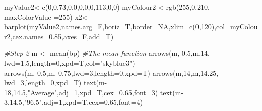 \documentclass[
]{book}
\newenvironment{Shaded}{\begin{snugshade}}{\end{snugshade}}
\newcommand{\AttributeTok}[1]{\textcolor[rgb]{0.77,0.63,0.00}{#1}}
\newcommand{\CommentTok}[1]{\textcolor[rgb]{0.56,0.35,0.01}{\textit{#1}}}
\newcommand{\ConstantTok}[1]{\textcolor[rgb]{0.00,0.00,0.00}{#1}}
\newcommand{\DecValTok}[1]{\textcolor[rgb]{0.00,0.00,0.81}{#1}}
\newcommand{\FloatTok}[1]{\textcolor[rgb]{0.00,0.00,0.81}{#1}}
\newcommand{\FunctionTok}[1]{\textcolor[rgb]{0.00,0.00,0.00}{#1}}
\newcommand{\NormalTok}[1]{#1}
\newcommand{\OtherTok}[1]{\textcolor[rgb]{0.56,0.35,0.01}{#1}}
\newcommand{\SpecialCharTok}[1]{\textcolor[rgb]{0.00,0.00,0.00}{#1}}
\newcommand{\StringTok}[1]{\textcolor[rgb]{0.31,0.60,0.02}{#1}}
\begin{document}
\begin{Shaded}
\begin{Highlighting}[]
\NormalTok{myValue2}\OtherTok{\textless{}{-}}\FunctionTok{c}\NormalTok{(}\DecValTok{0}\NormalTok{,}\DecValTok{0}\NormalTok{,}\DecValTok{73}\NormalTok{,}\DecValTok{0}\NormalTok{,}\DecValTok{0}\NormalTok{,}\DecValTok{0}\NormalTok{,}\DecValTok{0}\NormalTok{,}\DecValTok{0}\NormalTok{,}\DecValTok{113}\NormalTok{,}\DecValTok{0}\NormalTok{,}\DecValTok{0}\NormalTok{)}
\NormalTok{myColour2 }\OtherTok{\textless{}{-}}\FunctionTok{rgb}\NormalTok{(}\DecValTok{255}\NormalTok{,}\DecValTok{0}\NormalTok{,}\DecValTok{210}\NormalTok{, }\AttributeTok{maxColorValue =}\DecValTok{255}\NormalTok{)}
\NormalTok{x2}\OtherTok{\textless{}{-}} \FunctionTok{barplot}\NormalTok{(myValue2,}\AttributeTok{names.arg=}\NormalTok{F,}\AttributeTok{horiz=}\NormalTok{T,}\AttributeTok{border=}\ConstantTok{NA}\NormalTok{,}\AttributeTok{xlim=}\FunctionTok{c}\NormalTok{(}\DecValTok{0}\NormalTok{,}\DecValTok{120}\NormalTok{),}\AttributeTok{col=}\NormalTok{myColour2,}\AttributeTok{cex.names=}\FloatTok{0.85}\NormalTok{,}\AttributeTok{axes=}\NormalTok{F,}\AttributeTok{add=}\NormalTok{T)}

\CommentTok{\#Step 2}
\NormalTok{m }\OtherTok{\textless{}{-}} \FunctionTok{mean}\NormalTok{(bp) }\CommentTok{\#The mean function}
\FunctionTok{arrows}\NormalTok{(m,}\SpecialCharTok{{-}}\FloatTok{0.5}\NormalTok{,m,}\DecValTok{14}\NormalTok{, }\AttributeTok{lwd=}\FloatTok{1.5}\NormalTok{,}\AttributeTok{length=}\DecValTok{0}\NormalTok{,}\AttributeTok{xpd=}\NormalTok{T,}\AttributeTok{col=}\StringTok{"skyblue3"}\NormalTok{)}
\FunctionTok{arrows}\NormalTok{(m,}\SpecialCharTok{{-}}\FloatTok{0.5}\NormalTok{,m,}\SpecialCharTok{{-}}\FloatTok{0.75}\NormalTok{,}\AttributeTok{lwd=}\DecValTok{3}\NormalTok{,}\AttributeTok{length=}\DecValTok{0}\NormalTok{,}\AttributeTok{xpd=}\NormalTok{T)}
\FunctionTok{arrows}\NormalTok{(m,}\DecValTok{14}\NormalTok{,m,}\FloatTok{14.25}\NormalTok{, }\AttributeTok{lwd=}\DecValTok{3}\NormalTok{,}\AttributeTok{length=}\DecValTok{0}\NormalTok{,}\AttributeTok{xpd=}\NormalTok{T) }
\FunctionTok{text}\NormalTok{(m}\DecValTok{{-}18}\NormalTok{,}\FloatTok{14.5}\NormalTok{,}\StringTok{"Average"}\NormalTok{,}\AttributeTok{adj=}\DecValTok{1}\NormalTok{,}\AttributeTok{xpd=}\NormalTok{T,}\AttributeTok{cex=}\FloatTok{0.65}\NormalTok{,}\AttributeTok{font=}\DecValTok{3}\NormalTok{) }
\FunctionTok{text}\NormalTok{(m}\DecValTok{{-}3}\NormalTok{,}\FloatTok{14.5}\NormalTok{,}\StringTok{"96.5"}\NormalTok{,}\AttributeTok{adj=}\DecValTok{1}\NormalTok{,}\AttributeTok{xpd=}\NormalTok{T,}\AttributeTok{cex=}\FloatTok{0.65}\NormalTok{,}\AttributeTok{font=}\DecValTok{4}\NormalTok{) }


\end{Highlighting}
\end{Shaded}
\end{document}
